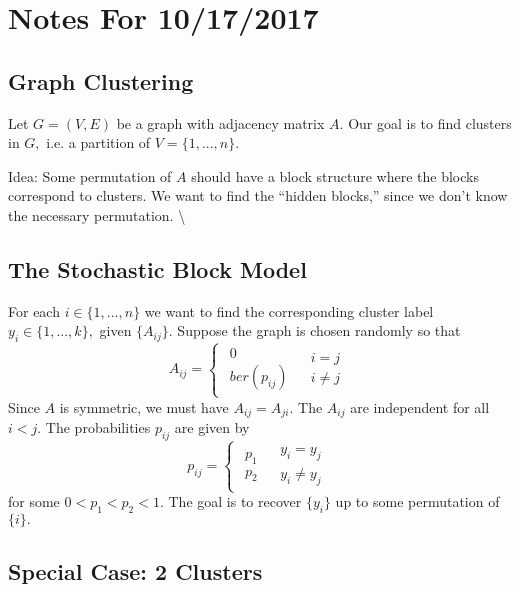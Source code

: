 \documentclass[english]{article}
\begin{document}
\section*{Notes For 10/17/2017}

\subsection*{Graph Clustering}

Let $G=(V,E)$ be a graph with adjacency matrix $A.$ Our goal is
to find clusters in $G,$ i.e. a partition of $V=\{1,...,n\}.$ 

Idea: Some permutation of $A$ should have a block structure where
the blocks correspond to clusters. We want to find the ``hidden blocks,''
since we don't know the necessary permutation. \textbackslash{}

\subsection*{The Stochastic Block Model}

For each $i\in\{1,...,n\}$ we want to find the corresponding cluster
label $y_{i}\in\{1,...,k\},$ given $\{A_{ij}\}.$ Suppose the graph
is chosen randomly so that 
\[
A_{ij}=\begin{cases}
\begin{array}{c}
0\\
ber(p_{ij})
\end{array} & \begin{array}{c}
i=j\\
i\neq j
\end{array}\end{cases}
\]
 Since $A$ is symmetric, we must have $A_{ij}=A_{ji}.$ The $A_{ij}$
are independent for all $i<j.$ The probabilities $p_{ij}$ are given
by 
\[
p_{ij}=\begin{cases}
\begin{array}{c}
p_{1}\\
p_{2}
\end{array} & \begin{array}{c}
y_{i}=y_{j}\\
y_{i}\neq y_{j}
\end{array}\end{cases}
\]
 for some $0<p_{1}<p_{2}<1.$ The goal is to recover $\{y_{i}\}$
up to some permutation of $\{i\}.$ 

\subsection*{Special Case: 2 Clusters}
\end{document}
